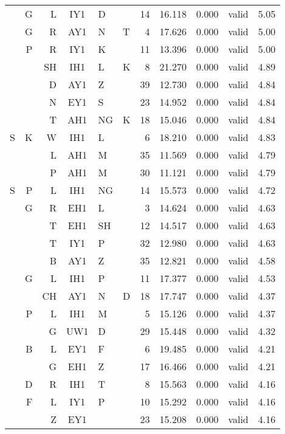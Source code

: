 \begin{longtable}{r@{ }r@{ }r@{ }c@{ }l@{ }l@{ } rrrrr}
  &  G &  L & IY1 & D  &    & 14 & 16.118 & 0.000 &   valid & 5.05 \\
  &  G &  R & AY1 & N  & T  &  4 & 17.626 & 0.000 &   valid & 5.00 \\
  &  P &  R & IY1 & K  &    & 11 & 13.396 & 0.000 &   valid & 5.00 \\
  &    & SH & IH1 & L  & K  &  8 & 21.270 & 0.000 &   valid & 4.89 \\
  &    &  D & AY1 & Z  &    & 39 & 12.730 & 0.000 &   valid & 4.84 \\
  &    &  N & EY1 & S  &    & 23 & 14.952 & 0.000 &   valid & 4.84 \\
  &    &  T & AH1 & NG & K  & 18 & 15.046 & 0.000 &   valid & 4.84 \\
S &  K &  W & IH1 & L  &    &  6 & 18.210 & 0.000 &   valid & 4.83 \\
  &    &  L & AH1 & M  &    & 35 & 11.569 & 0.000 &   valid & 4.79 \\
  &    &  P & AH1 & M  &    & 30 & 11.121 & 0.000 &   valid & 4.79 \\
S &  P &  L & IH1 & NG &    & 14 & 15.573 & 0.000 &   valid & 4.72 \\
  &  G &  R & EH1 & L  &    &  3 & 14.624 & 0.000 &   valid & 4.63 \\
  &    &  T & EH1 & SH &    & 12 & 14.517 & 0.000 &   valid & 4.63 \\
  &    &  T & IY1 & P  &    & 32 & 12.980 & 0.000 &   valid & 4.63 \\
  &    &  B & AY1 & Z  &    & 35 & 12.821 & 0.000 &   valid & 4.58 \\
  &  G &  L & IH1 & P  &    & 11 & 17.377 & 0.000 &   valid & 4.53 \\
  &    & CH & AY1 & N  & D  & 18 & 17.747 & 0.000 &   valid & 4.37 \\
  &  P &  L & IH1 & M  &    &  5 & 15.126 & 0.000 &   valid & 4.37 \\
  &    &  G & UW1 & D  &    & 29 & 15.448 & 0.000 &   valid & 4.32 \\
  &  B &  L & EY1 & F  &    &  6 & 19.485 & 0.000 &   valid & 4.21 \\
  &    &  G & EH1 & Z  &    & 17 & 16.466 & 0.000 &   valid & 4.21 \\
  &  D &  R & IH1 & T  &    &  8 & 15.563 & 0.000 &   valid & 4.16 \\
  &  F &  L & IY1 & P  &    & 10 & 15.292 & 0.000 &   valid & 4.16 \\
  &    &  Z & EY1 &    &    & 23 & 15.208 & 0.000 &   valid & 4.16 \\

\end{longtable}
